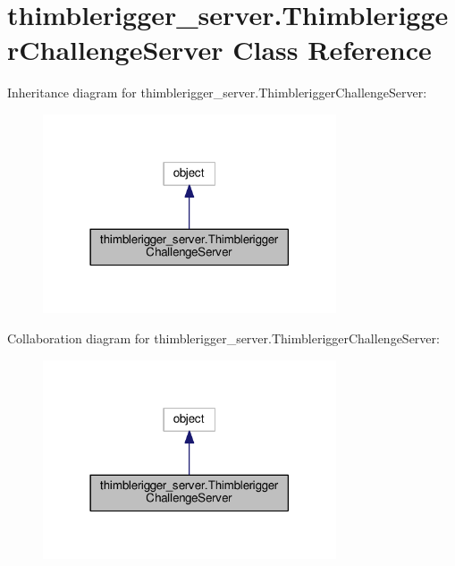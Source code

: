 \hypertarget{classthimblerigger__server_1_1ThimbleriggerChallengeServer}{}\section{thimblerigger\+\_\+server.\+Thimblerigger\+Challenge\+Server Class Reference}
\label{classthimblerigger__server_1_1ThimbleriggerChallengeServer}


Inheritance diagram for thimblerigger\+\_\+server.\+Thimblerigger\+Challenge\+Server\+:\nopagebreak
\begin{figure}[H]
\begin{center}
\leavevmode
\includegraphics[width=246pt]{classthimblerigger__server_1_1ThimbleriggerChallengeServer__inherit__graph}
\end{center}
\end{figure}


Collaboration diagram for thimblerigger\+\_\+server.\+Thimblerigger\+Challenge\+Server\+:\nopagebreak
\begin{figure}[H]
\begin{center}
\leavevmode
\includegraphics[width=246pt]{classthimblerigger__server_1_1ThimbleriggerChallengeServer__coll__graph}
\end{center}
\end{figure}
